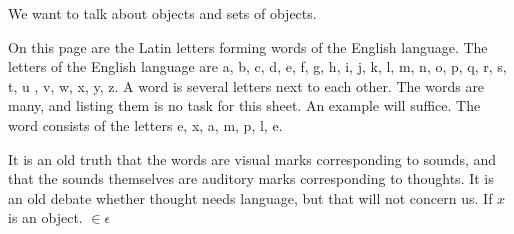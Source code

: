 

We want to talk about objects and sets of objects.


On this page are the Latin letters forming words of the English language.
The letters of the English language are a, b, c, d, e, f, g, h, i, j, k, l, m, n, o, p, q, r, s, t, u , v, w, x, y, z.
A word is several letters next to each other.
The words are many, and listing them is no task for this sheet.
An example will suffice.
The word  consists of the letters e, x, a, m, p, l, e.

It is an old truth that the words are visual marks corresponding to sounds, and that the sounds themselves are auditory marks corresponding to thoughts.
It is an old debate whether thought needs language, but that will not concern us.
If $x$ is an object.
$\in$$\epsilon$

%
%
%
%
%
%
%
%
%


